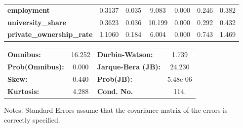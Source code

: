 \begin{center}
\begin{tabular}{lcccccc}
\textbf{employment}               &       0.3137  &        0.035     &     9.083  &         0.000        &        0.246    &        0.382     \\
\textbf{university\_share}        &       0.3623  &        0.036     &    10.199  &         0.000        &        0.292    &        0.432     \\
\textbf{private\_ownership\_rate} &       1.1060  &        0.184     &     6.004  &         0.000        &        0.743    &        1.469     \\
\bottomrule
\end{tabular}
\begin{tabular}{lclc}
\textbf{Omnibus:}       & 16.252 & \textbf{  Durbin-Watson:     } &    1.739  \\
\textbf{Prob(Omnibus):} &  0.000 & \textbf{  Jarque-Bera (JB):  } &   24.230  \\
\textbf{Skew:}          &  0.440 & \textbf{  Prob(JB):          } & 5.48e-06  \\
\textbf{Kurtosis:}      &  4.288 & \textbf{  Cond. No.          } &     114.  \\
\bottomrule
\end{tabular}
\end{center}

Notes: \newline
 [1] Standard Errors assume that the covariance matrix of the errors is correctly specified.